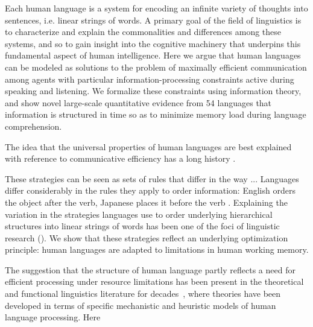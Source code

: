 
Each human language is a system for encoding an infinite variety of thoughts into sentences, i.e. linear strings of words.
A primary goal of the field of linguistics is to characterize and explain the commonalities and differences among these systems, and so to gain insight into the cognitive machinery that underpins this fundamental aspect of human intelligence.
Here we argue that human languages can be modeled as solutions to the problem of maximally efficient communication among agents with particular information-processing constraints active during speaking and listening.
We formalize these constraints using information theory, and show novel large-scale quantitative evidence from 54 languages that information is structured in time so as to minimize memory load during language comprehension.

The idea that the universal properties of human languages are best explained with reference to communicative efficiency has a long history \cite{gabelentz1901sprachwissenschaft,zipf1949human,hockett1960origin,givon1991markedness,hawkins1994performance,hawkins2004efficiency,hawkins2014crosslinguistic,croft2001functional,haspelmath2008parametric,jaeger2011language,gibson2019efficiency}.



These strategies can be seen as sets of rules that differ in the way ...
Languages differ considerably in the rules they apply to order information: English orders the object after the verb, Japanese places it before the verb .
Explaining the variation in the strategies languages use to  order underlying hierarchical structures into linear strings of words has been one of the foci of linguistic research ().
We show that these strategies reflect an underlying optimization principle: human languages are adapted to limitations in human working memory.

The suggestion that the structure of human language partly reflects a need for efficient processing under resource limitations has been present in the theoretical and functional linguistics literature for decades~\cite{berwick1984grammatical,hawkins1994performance}, where theories have been developed in terms of specific mechanistic and heuristic models of human language processing.
Here 




